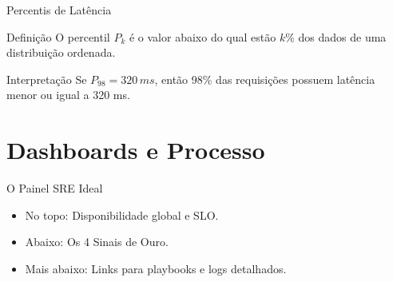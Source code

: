 \documentclass[9pt]{beamer}
\begin{document}
\begin{frame}{Percentis de Latência}

\begin{block}{Definição}
O percentil $P_k$ é o valor abaixo do qual estão $k\%$ dos dados de uma distribuição ordenada.
\end{block}

\begin{center}
\end{center}

\begin{alertblock}{Interpretação}
Se $P_{98} = 320\,ms$, então 98\% das requisições possuem latência menor ou igual a 320 ms.
\end{alertblock}

\end{frame} 



\section{Dashboards e Processo}

\begin{frame}{O Painel SRE Ideal}
\begin{itemize}
    \item No topo: Disponibilidade global e SLO.
    \item Abaixo: Os 4 Sinais de Ouro.
    \item Mais abaixo: Links para playbooks e logs detalhados.
\end{itemize}
\end{frame}
\end{document}
